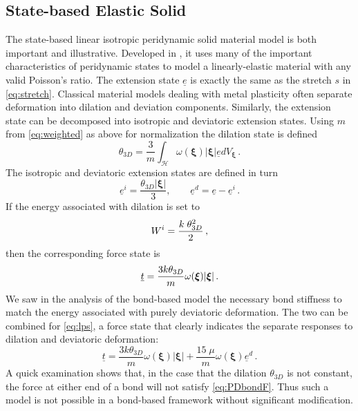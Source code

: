 \subsection{State-based Elastic Solid}
The state-based linear isotropic peridynamic solid material model is both important and illustrative.
Developed in \cite{silling2007peridynamic}, it uses many of the important characteristics of peridynamic states to model a linearly-elastic material with any valid Poisson's ratio.
The extension state $\underline{e}$ is exactly the same as the stretch $s$ in \cref{eq:stretch}.
Classical material models dealing with metal plasticity often separate deformation into dilation and deviation components.
Similarly, the extension state can be decomposed into isotropic and deviatoric extension states. Using $m$ from \cref{eq:weighted} as above for normalization the dilation state is defined
%
\begin{equation}
    \theta_{3D} = \frac{3}{m} \int_\mathcal{H} \omega(\boldsymbol{\xi}) |\boldsymbol{\xi}| \underline{e} dV_{\boldsymbol{\xi}}\, .
\end{equation}
%
The isotropic and deviatoric extension states are defined in turn
%
\begin{equation}
\underline{e}^i = \frac{\theta_{3D} |\boldsymbol{\xi}|}{3},\qquad \underline{e}^d = \underline{e}-\underline{e}^i\, .
\end{equation}
%
If the energy associated with dilation is set to
%
\begin{equation}
W^i = \frac{k\;\theta^2_{3D}}{2}\, ,\notag
\end{equation}
%
then the corresponding force state is
%
\begin{equation}
\underline{t} = \frac{3k\theta_{3D}}{m}\omega(\boldsymbol{\xi})|\boldsymbol{\xi}|\, .\notag
\end{equation}
%
We saw in the analysis of the bond-based model the necessary bond stiffness to match the energy associated with purely deviatoric deformation.
The two can be combined for \cref{eq:lps}, a force state that clearly indicates the separate responses to dilation and deviatoric deformation:
%
\begin{equation}
\label{eq:lps}
\underline{t} = \frac{3k\theta_{3D}}{m}\omega(\boldsymbol{\xi})|\boldsymbol{\xi}| + \frac{15\;\mu}{m}\omega(\boldsymbol{\xi})\underline{e}^d\, .
\end{equation}
%
A quick examination shows that, in the case that the dilation $\theta_{3D}$ is not constant, the force at either end of a bond will not satisfy \cref{eq:PDbondF}.
Thus such a model is not possible in a bond-based framework without significant modification.


